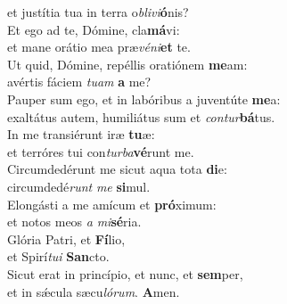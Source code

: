 \oddverse et justítia tua in terra o\textit{bli}\textit{vi}\textbf{ó}nis?\\
\evenverse Et ego ad te, Dómine, cla\textbf{má}vi:~\*\\
\evenverse et mane orátio mea præ\textit{vé}\textit{ni}\textbf{et} te.\\
\oddverse Ut quid, Dómine, repéllis oratiónem \textbf{me}am:~\*\\
\oddverse avértis fáciem \textit{tu}\textit{am} \textbf{a} me?\\
\evenverse Pauper sum ego, et in labóribus a juventúte \textbf{me}a:~\*\\
\evenverse exaltátus autem, humiliátus sum et \textit{con}\textit{tur}\textbf{bá}tus.\\
\oddverse In me transiérunt iræ \textbf{tu}æ:~\*\\
\oddverse et terróres tui con\textit{tur}\textit{ba}\textbf{vé}runt me.\\
\evenverse Circumdedérunt me sicut aqua tota \textbf{di}e:~\*\\
\evenverse circumdedé\textit{runt} \textit{me} \textbf{si}mul.\\
\oddverse Elongásti a me amícum et \textbf{pró}ximum:~\*\\
\oddverse et notos meos \textit{a} \textit{mi}\textbf{sé}ria.\\
\evenverse Glória Patri, et \textbf{Fí}lio,~\*\\
\evenverse et Spirí\textit{tu}\textit{i} \textbf{San}cto.\\
\oddverse Sicut erat in princípio, et nunc, et \textbf{sem}per,~\*\\
\oddverse et in sǽcula sæcu\textit{ló}\textit{rum}. \textbf{A}men.\\
